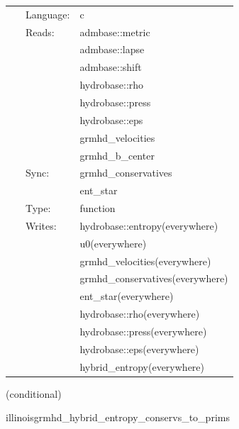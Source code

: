  \begin{tabular*}{160mm}{cll} 
~ & Language:  & c \\ 
~ & Reads:  & admbase::metric \\ 
~& ~ &admbase::lapse\\ 
~& ~ &admbase::shift\\ 
~& ~ &hydrobase::rho\\ 
~& ~ &hydrobase::press\\ 
~& ~ &hydrobase::eps\\ 
~& ~ &grmhd\_velocities\\ 
~& ~ &grmhd\_b\_center\\ 
~ & Sync:  & grmhd\_conservatives \\ 
~& ~ &ent\_star\\ 
~ & Type:  & function \\ 
~ & Writes:  & hydrobase::entropy(everywhere) \\ 
~& ~ &u0(everywhere)\\ 
~& ~ &grmhd\_velocities(everywhere)\\ 
~& ~ &grmhd\_conservatives(everywhere)\\ 
~& ~ &ent\_star(everywhere)\\ 
~& ~ &hydrobase::rho(everywhere)\\ 
~& ~ &hydrobase::press(everywhere)\\ 
~& ~ &hydrobase::eps(everywhere)\\ 
~& ~ &hybrid\_entropy(everywhere)\\ 
\end{tabular*} 


\vspace{5mm}

   (conditional) 

\hspace{5mm} illinoisgrmhd\_hybrid\_entropy\_conservs\_to\_prims 

\hspace{5mm}{\it entropy+hybrid version of illinoisgrmhd\_conservs\_to\_prims } 


\hspace{5mm}

